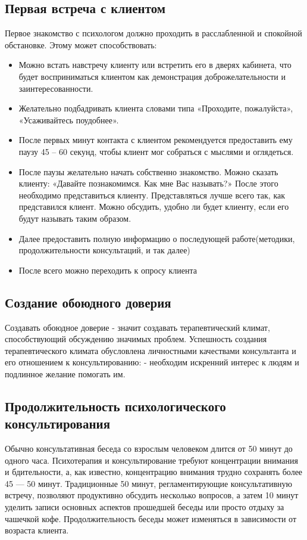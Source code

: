 \documentclass[a4paper, 12pt]{report}
\begin{document}
    \subsection*{Первая встреча с клиентом}
Первое знакомство с психологом должно проходить в расслабленной и спокойной 
обстановке. Этому может способствовать:
\begin{itemize}[noitemsep]
    \item Можно встать навстречу клиенту или встретить его в дверях кабинета, что
    будет восприниматься клиентом как демонстрация доброжелательности и
    заинтересованности.
    \item Желательно подбадривать клиента словами типа «Проходите,
    пожалуйста», «Усаживайтесь поудобнее».
    \item После первых минут контакта с клиентом рекомендуется предоставить
    ему паузу 45 – 60 секунд, чтобы клиент мог собраться с мыслями и
    оглядеться.
    \item После паузы желательно начать собственно знакомство. Можно сказать
    клиенту: «Давайте познакомимся. Как мне Вас называть?» После этого
    необходимо представиться клиенту. Представляться лучше всего так, как
    представился клиент. Можно обсудить, удобно ли будет клиенту, если его
    будут называть таким образом.
    \item Далее предоставить полную информацию о последующей работе(методики, 
    продолжительности консультаций, и так далее)
    \item После всего можно переходить к опросу клиента
\end{itemize}
    \subsection*{Создание обоюдного доверия}
Создавать обоюдное доверие - значит создавать терапевтический климат, 
способствующий обсуждению значимых проблем. Успешность создания 
терапевтического климата обусловлена личностными 
качествами консультанта и его отношением к консультированию: - необходим 
искренний интерес к людям и подлинное желание помогать им.
    \subsection*{Продолжительность психологического консультирования}
Обычно консультативная беседа со взрослым человеком длится от 50
минут до одного часа. Психотерапия и консультирование требуют
концентрации внимания и бдительности, а, как известно, концентрацию
внимания трудно сохранять более 45 — 50 минут. Традиционные 50 минут,
регламентирующие консультативную встречу, позволяют продуктивно
обсудить несколько вопросов, а затем 10 минут уделить записи основных
аспектов прошедшей беседы или просто отдыху за чашечкой кофе.
Продолжительность беседы может изменяться в зависимости от
возраста клиента. 
\end{document}
